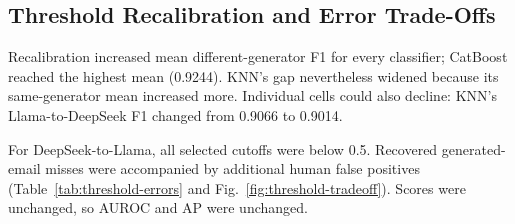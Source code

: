 \documentclass[conference]{IEEEtran}
\begin{document}
\subsection{Threshold Recalibration and Error Trade-Offs}

Recalibration increased mean different-generator F1 for every
classifier; CatBoost reached the highest mean (0.9244).
KNN's gap nevertheless widened because its same-generator
mean increased more. Individual cells could also decline:
KNN's Llama-to-DeepSeek F1 changed from 0.9066 to 0.9014.

For DeepSeek-to-Llama, all selected cutoffs were below 0.5.
Recovered generated-email misses were accompanied by additional
human false positives (Table~\ref{tab:threshold-errors} and
Fig.~\ref{fig:threshold-tradeoff}). Scores were unchanged,
so AUROC and AP were unchanged.
\end{document}
